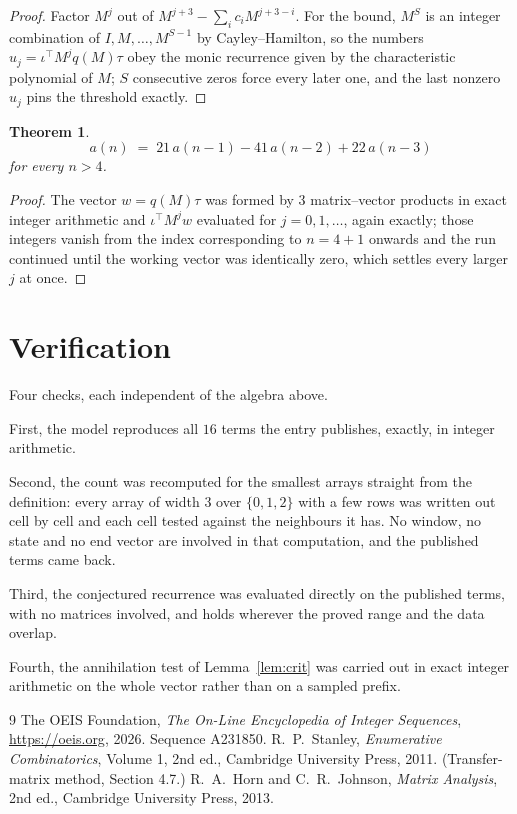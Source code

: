 \documentclass[11pt,a4paper]{article}
\theoremstyle{plain}
\newtheorem{theorem}{Theorem}
\theoremstyle{definition}
\begin{document}
\begin{proof}
Factor $M^{j}$ out of $M^{j+3}-\sum_ic_iM^{j+3-i}$. For the bound, $M^{S}$
is an integer combination of $I,M,\dots,M^{S-1}$ by Cayley--Hamilton, so the numbers
$u_j=\iota^{\!\top}M^{j}q(M)\tau$ obey the monic recurrence given by the characteristic
polynomial of $M$; $S$ consecutive zeros force every later one, and the last nonzero $u_j$
pins the threshold exactly.
\end{proof}

\begin{theorem}
\[
a(n)\;=\;21\,a(n-1) - 41\,a(n-2) + 22\,a(n-3)
\]
for every $n>4$.
\end{theorem}

\begin{proof}
The vector $w=q(M)\tau$ was formed by $3$ matrix--vector products in exact integer
arithmetic and $\iota^{\!\top}M^{j}w$ evaluated for $j=0,1,\dots$, again exactly; those
integers vanish from the index corresponding to $n=4+1$ onwards and the run continued
until the working vector was identically zero, which settles every larger $j$ at once.
\end{proof}

\section{Verification}

Four checks, each independent of the algebra above.

First, the model reproduces all $16$ terms the entry publishes, exactly, in integer
arithmetic.

Second, the count was recomputed for the smallest arrays straight from the definition: every
array of width $3$ over $\{0,1,2\}$ with a few rows was written out cell by cell and each cell
tested against the neighbours it has. No window, no state and no end vector are involved in that
computation, and the published terms came back.

Third, the conjectured recurrence was evaluated directly on the published terms, with no
matrices involved, and holds wherever the proved range and the data overlap.

Fourth, the annihilation test of Lemma~\ref{lem:crit} was carried out in exact integer
arithmetic on the whole vector rather than on a sampled prefix.

\begin{thebibliography}{9}
 The OEIS Foundation, \emph{The On-Line Encyclopedia of Integer
Sequences}, \url{https://oeis.org}, 2026. Sequence A231850.
 R.~P.~Stanley, \emph{Enumerative Combinatorics}, Volume 1, 2nd ed.,
Cambridge University Press, 2011. (Transfer-matrix method, Section 4.7.)
 R.~A.~Horn and C.~R.~Johnson, \emph{Matrix Analysis}, 2nd ed., Cambridge
University Press, 2013.
\end{thebibliography}
\end{document}
